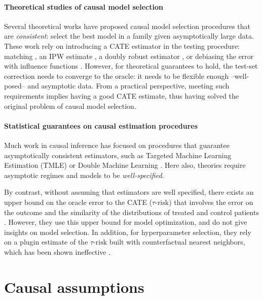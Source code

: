 \documentclass[unnumsec,webpdf,contemporary,large]{oup-authoring-template}%
\theoremstyle{thmstyleone}%
\theoremstyle{thmstyletwo}%
\theoremstyle{thmstylethree}%
\begin{document}
\begin{appendices}
    \paragraph{Theoretical studies of causal model selection}

    Several theoretical works have proposed causal model selection procedures
    that are \emph{consistent}: select the best model in a family given
    asymptotically large data. These work rely on introducing a
    CATE estimator in the testing procedure: matching
    \cite{rolling_model_2014}, an IPW estimate
    \cite{gutierrez_causal_2016}, a doubly robust estimator
    \cite{saito_counterfactual_2020}, or debiasing the error with influence
    functions \cite{alaa_validating_2019}. However, for theoretical
    guarantees to hold, the test-set correction needs to converge to the
    oracle: it needs to be flexible enough --well-posed-- and asymptotic
    data. From a practical perspective, meeting such requirements
    implies having a good CATE estimate, thus having solved
    the original problem of causal model selection.

    \paragraph{Statistical guarantees on causal estimation procedures}

    Much work in causal inference has focused on procedures that
    guarantee asymptotically consistent estimators, such as Targeted
    Machine Learning
    Estimation (TMLE) \cite{laan_targeted_2011,schuler_targeted_2017} or
    Double Machine Learning \cite{chernozhukov_double_2018}. Here also, theories require asymptotic regimes and
    models to be \textit{well-specified}.

    By contrast, without assuming that estimators are well specified, there exists an upper bound
    on the oracle error to the CATE ($\tau\text{-risk}$) that involves the error on
    the outcome and the similarity of the distributions of treated and control
    patients \cite{johansson2022generalization}. However, they use this upper bound for model optimization,
    and do not give insights on model selection. In addition, for hyperparameter
    selection, they rely on a plugin estimate of the $\tau\text{-risk}$ built with
    counterfactual nearest neighbors, which has been shown ineffective
    \cite{schuler_comparison_2018}.


    \section{Causal assumptions}\label{apd:causal_assumptions}


\end{appendices}
\end{document}

